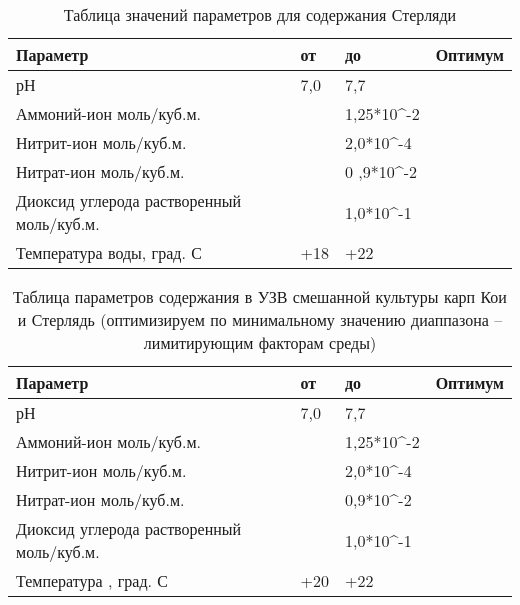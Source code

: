     \begin{table}[H]
        \caption{Таблица значений параметров для содержания Стерляди}
        \begin{tabular}{|l|l|l|l|}
        \hline
        Параметр &	от &	до &	Оптимум \\
        \hline
        рН &	7,0 &	7,7	& \\
        \hline
        Аммоний-ион моль/куб.м.	&   & 1,25*10^{-2}  & \\
        \hline
        Нитрит-ион моль/куб.м. &	&	2,0*10^{-4} &	\\
        \hline
        Нитрат-ион моль/куб.м. &	&  0 ,9*10^{-2}  & \\
        \hline	
        Диоксид углерода 
        растворенный  моль/куб.м. &    & 1,0*10^{-1}	&\\ 
        \hline
        Температура  воды, град. С	&  +18 & +22	&\\
        \end{tabular}
    \end{table}
\begin{table}[H]
    \caption{Таблица параметров содержания в УЗВ смешанной культуры карп Кои и Стерлядь 
    (оптимизируем по минимальному значению диаппазона – лимитирующим факторам среды)}
    \begin{tabular}{|l|l|l|l|}
        \hline
        Параметр &	от &	до &	Оптимум \\
        \hline
        рН	& 7,0 &	7,7	& \\
        \hline
        Аммоний-ион моль/куб.м.	&  &	1,25*10^{-2}	& \\
        \hline
        Нитрит-ион моль/куб.м. &  &	    2,0*10^{-4}	& \\
        \hline
        Нитрат-ион моль/куб.м. &  &	0,9*10^{-2} & \\
        \hline	
        Диоксид углерода 
        растворенный   моль/куб.м. &  &		1,0*10^{-1}	& \\
        \hline
        Температура , град. С &	+20	 & +22 &	\\  
    \end{tabular}
\end{table}